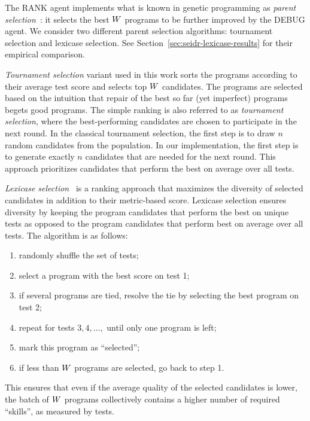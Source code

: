 The RANK agent implements what is known in genetic programming as \emph{parent selection}~\cite{koza1994:genetic}: it selects the best $W{}$ programs to be further improved by the DEBUG agent.
We consider two different parent selection algorithms: tournament selection and lexicase selection. 
See Section~\ref{sec:seidr-lexicase-results} for their empirical comparison.

\emph{Tournament selection} variant used in this work sorts the programs according to their average test score and selects top $W{}$ candidates. 
The programs are selected based on the intuition that repair of the best so far (yet imperfect) programs begets good programs. 
The simple ranking is also referred to as \emph{tournament selection}, where the best-performing candidates are chosen to participate in the next round.  
In the classical tournament selection, the first step is to draw $n$ random candidates from the population. 
In our implementation, the first step is to generate exactly $n$ candidates that are needed for the next round. 
This approach prioritizes candidates that perform the best on average over all tests.

\emph{Lexicase selection}~\cite{helmuth2015:solving} is a ranking approach that maximizes the diversity of selected candidates in addition to their metric-based score.
Lexicase selection ensures diversity by keeping the program candidates that perform the best on unique tests as opposed to the program candidates that perform best on average over all tests.
The algorithm is as follows:
\begin{enumerate}

\setlength{\parskip}{0pt}
\setlength\itemsep{0pt}

    \item randomly shuffle the set of tests;
    \item select a program with the best score on test 1;
    \item if several programs are tied, resolve the tie by selecting the best program on test 2;
    \item repeat for tests $3,4,\dots,$ until only one program is left;
    \item mark this program as ``selected'';
    \item if less than $W$ programs are selected, go back to step 1.
\end{enumerate}
This ensures that even if the average quality of the selected candidates is lower, the batch of $W{}$ programs collectively contains a higher number of required ``skills'', as measured by tests.



